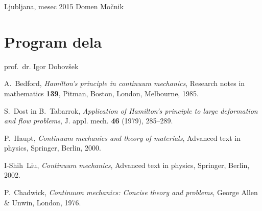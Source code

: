 \documentclass[12pt,a4paper]{report}
\begin{document}
\null

\noindent Ljubljana, mesec 2015 \hfill Domen Močnik
\pagebreak

\tableofcontents
\pagebreak

\chapter*{Program dela}


\null

\noindent prof.~dr. Igor Dobovšek
\pagebreak


\pagebreak







\begin{thebibliography}{99}

A.~Bedford, \emph{Hamilton's principle in continuum mechanics}, Research notes in mathematics {\bf 139},
Pitman, Boston, London, Melbourne, 1985.

S.~Dost in B.~Tabarrok, \emph{Application of Hamilton's principle to large deformation and flow problems},
J. appl. mech. {\bf 46} (1979), 285--289.

P.~Haupt, \emph{Continuum mechanics and theory of materials}, Advanced text in physics,
Springer, Berlin, 2000.

I-Shih~Liu, \emph{Continuum mechanics}, Advanced text in physics,
Springer, Berlin, 2002.

P.~Chadwick, \emph{Continuum mechanics: Concise theory and problems},
George Allen \& Unwin, London, 1976.

\end{thebibliography}
\end{document}
